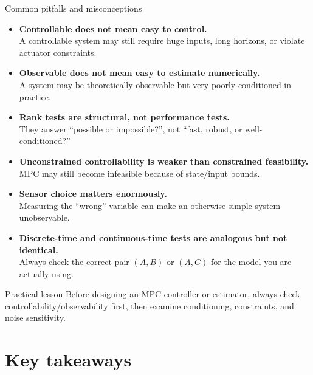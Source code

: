 \documentclass[aspectratio=169,10pt]{beamer}
\begin{document}
\begin{frame}{Common pitfalls and misconceptions}
\begin{itemize}
  \item \textbf{Controllable does not mean easy to control.}\\
  A controllable system may still require huge inputs, long horizons, or violate actuator constraints.

  \item \textbf{Observable does not mean easy to estimate numerically.}\\
  A system may be theoretically observable but very poorly conditioned in practice.

  \item \textbf{Rank tests are structural, not performance tests.}\\
  They answer ``possible or impossible?'', not ``fast, robust, or well-conditioned?''

  \item \textbf{Unconstrained controllability is weaker than constrained feasibility.}\\
  MPC may still become infeasible because of state/input bounds.

  \item \textbf{Sensor choice matters enormously.}\\
  Measuring the ``wrong'' variable can make an otherwise simple system unobservable.

  \item \textbf{Discrete-time and continuous-time tests are analogous but not identical.}\\
  Always check the correct pair \((A,B)\) or \((A,C)\) for the model you are actually using.
\end{itemize}

\begin{alertbox}{Practical lesson}
Before designing an MPC controller or estimator, always check controllability/observability first, then examine conditioning, constraints, and noise sensitivity.
\end{alertbox}
\end{frame}


\section{Key takeaways}
\end{document}
